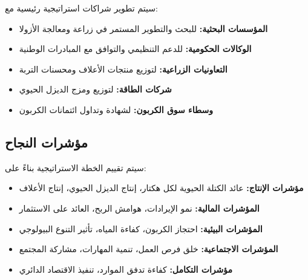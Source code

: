 سيتم تطوير شراكات استراتيجية رئيسية مع:

\begin{itemize}
    \item \textbf{المؤسسات البحثية:} للبحث والتطوير المستمر في زراعة ومعالجة الأزولا
    \item \textbf{الوكالات الحكومية:} للدعم التنظيمي والتوافق مع المبادرات الوطنية
    \item \textbf{التعاونيات الزراعية:} لتوزيع منتجات الأعلاف ومحسنات التربة
    \item \textbf{شركات الطاقة:} لتوزيع ومزج الديزل الحيوي
    \item \textbf{وسطاء سوق الكربون:} لشهادة وتداول ائتمانات الكربون
\end{itemize}

\subsection{مؤشرات النجاح}

سيتم تقييم الخطة الاستراتيجية بناءً على:

\begin{itemize}
    \item \textbf{مؤشرات الإنتاج:} عائد الكتلة الحيوية لكل هكتار، إنتاج الديزل الحيوي، إنتاج الأعلاف
    \item \textbf{المؤشرات المالية:} نمو الإيرادات، هوامش الربح، العائد على الاستثمار
    \item \textbf{المؤشرات البيئية:} احتجاز الكربون، كفاءة المياه، تأثير التنوع البيولوجي
    \item \textbf{المؤشرات الاجتماعية:} خلق فرص العمل، تنمية المهارات، مشاركة المجتمع
    \item \textbf{مؤشرات التكامل:} كفاءة تدفق الموارد، تنفيذ الاقتصاد الدائري
\end{itemize}
